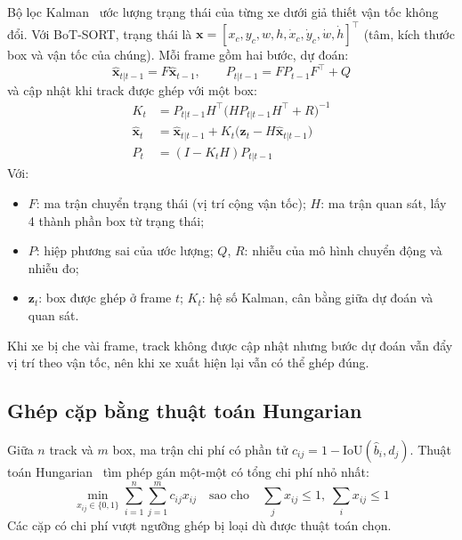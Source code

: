 Bộ lọc Kalman~\cite{kalman1960} ước lượng trạng thái của từng xe dưới giả thiết vận tốc không đổi. Với BoT-SORT, trạng
thái là $\mathbf{x} = [x_c, y_c, w, h, \dot{x}_c, \dot{y}_c, \dot{w}, \dot{h}]^{\top}$ (tâm, kích thước box và vận tốc
của chúng). Mỗi frame gồm hai bước, dự đoán:
\begin{equation}
  \hat{\mathbf{x}}_{t|t-1} = F \hat{\mathbf{x}}_{t-1}, \qquad P_{t|t-1} = F P_{t-1} F^{\top} + Q
  \label{eq:kalman-predict}
\end{equation}
và cập nhật khi track được ghép với một box:
\begin{equation}
  \begin{split}
    K_t &= P_{t|t-1} H^{\top} \big( H P_{t|t-1} H^{\top} + R \big)^{-1} \\
    \hat{\mathbf{x}}_{t} &= \hat{\mathbf{x}}_{t|t-1} + K_t \big( \mathbf{z}_t - H \hat{\mathbf{x}}_{t|t-1} \big) \\
    P_t &= (I - K_t H) P_{t|t-1}
  \end{split}
  \label{eq:kalman-update}
\end{equation}
Với:
\begin{itemize}
  \item $F$: ma trận chuyển trạng thái (vị trí cộng vận tốc); $H$: ma trận quan sát, lấy 4 thành phần box từ trạng thái;
  \item $P$: hiệp phương sai của ước lượng; $Q$, $R$: nhiễu của mô hình chuyển động và nhiễu đo;
  \item $\mathbf{z}_t$: box được ghép ở frame $t$; $K_t$: hệ số Kalman, cân bằng giữa dự đoán và quan sát.
\end{itemize}

Khi xe bị che vài frame, track không được cập nhật nhưng bước dự đoán vẫn đẩy vị trí theo vận tốc, nên khi xe xuất hiện
lại vẫn có thể ghép đúng.

\subsection{Ghép cặp bằng thuật toán Hungarian}

Giữa $n$ track và $m$ box, ma trận chi phí có phần tử $c_{ij} = 1 - \mathrm{IoU}(\hat{b}_i, d_j)$. Thuật toán
Hungarian~\cite{kuhn1955hungarian} tìm phép gán một-một có tổng chi phí nhỏ nhất:
\begin{equation}
  \min_{x_{ij} \in \{0, 1\}} \sum_{i=1}^{n} \sum_{j=1}^{m} c_{ij} x_{ij}
  \quad \text{sao cho} \quad \sum_{j} x_{ij} \le 1,\; \sum_{i} x_{ij} \le 1
  \label{eq:hungarian}
\end{equation}
Các cặp có chi phí vượt ngưỡng ghép bị loại dù được thuật toán chọn.

